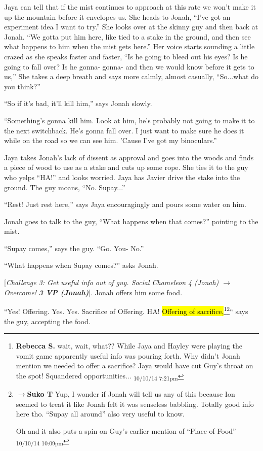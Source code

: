 Jaya can tell that if the mist continues to approach at this rate we won't make it up the mountain before it envelopes us.  She heads to Jonah, ``I've got an experiment idea I want to try.''  She looks over at the skinny guy and then back at Jonah. ``We gotta put him here, like tied to a stake in the ground, and then see what happens to him when the mist gets here.''  Her voice starts sounding a little crazed as she speaks faster and faster, ``Is he going to bleed out his eyes?  Is he going to fall over?  Is he gonna- gonna- and then we would know before it gets to us,''  She takes a deep breath and says more calmly, almost casually, ``So...what do you think?''

``So if it's bad, it'll kill him,'' says Jonah slowly.

``Something's gonna kill him.  Look at him, he's probably not going to make it to the next switchback.  He's gonna fall over.  I just want to make sure he does it while on the road so we can see him.  'Cause I've got my binoculars.''

Jaya takes Jonah's lack of dissent as approval and goes into the woods and finds a piece of wood to use as a stake and cuts up some rope.  She ties it to the guy who yelps ``HA!'' and looks worried.  Jaya has Javier drive the stake into the ground.  The guy moans, ``No.  Supay...''

``Rest!  Just rest here,'' says Jaya encouragingly and pours some water on him.

Jonah goes to talk to the guy, ``What happens when that comes?'' pointing to the mist.

``Supay comes,'' says the guy.  ``Go.  You- No.''

``What happens when Supay comes?'' asks Jonah.

{[}\textit{Challenge 3: Get useful info out of guy.  Social Chameleon 4 (Jonah) $\rightarrow$ Overcome! }\textit{\textbf{3 VP (Jonah)}}{]}.  Jonah offers him some food.

``Yes!  Offering.  Yes.  Yes.  Sacrifice of Offering.  HA! \hl{Offering of sacrifice,}\footnote{\textbf{Rebecca S. }wait, wait, what?? While Jaya and Hayley were playing the vomit game apparently useful info was pouring forth.  Why didn't Jonah mention we needed to offer a sacrifice? Jaya would have cut Guy's throat on the spot! 
Squandered opportunities... \textsubscript{10/10/14 7:21pm}}\footnote{$\rightarrow$\textbf{Suko T }Yup, I wonder if Jonah will tell us any of this because Ion seemed to treat it like Jonah felt it was senseless babbling.  Totally good info here tho.  ``Supay all around'' also very useful to know.

Oh and it also puts a spin on Guy's earlier mention of ``Place of Food'' \textsubscript{10/10/14 10:09pm}}`` says the guy, accepting the food.

